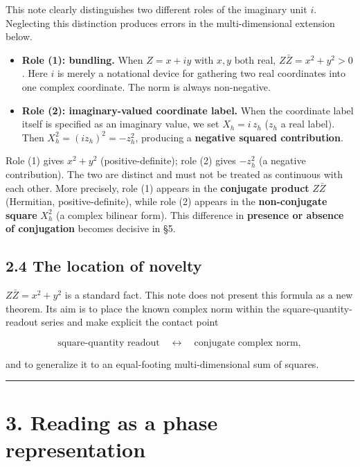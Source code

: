 \documentclass[11pt,a4paper]{article}
\providecommand{\tightlist}{\setlength{\itemsep}{0pt}\setlength{\parskip}{0pt}}
\begin{document}
This note clearly distinguishes two different roles of the imaginary
unit \(i\). Neglecting this distinction produces errors in the
multi-dimensional extension below.

\begin{itemize}
\tightlist
\item
  \textbf{Role (1): bundling.} When \(Z=x+iy\) with \(x,y\) both real,
  \(Z\bar Z=x^2+y^2>0\). Here \(i\) is merely a notational device for
  gathering two real coordinates into one complex coordinate. The norm
  is always non-negative.
\item
  \textbf{Role (2): imaginary-valued coordinate label.} When the
  coordinate label itself is specified as an imaginary value, we set
  \(X_h=i\,z_h\) (\(z_h\) a real label). Then
  \(X_h^2=(i z_h)^2=-z_h^2\), producing a \textbf{negative squared
  contribution}.
\end{itemize}

Role (1) gives \(x^2+y^2\) (positive-definite); role (2) gives
\(-z_h^2\) (a negative contribution). The two are distinct and must not
be treated as continuous with each other. More precisely, role (1)
appears in the \textbf{conjugate product} \(Z\bar Z\) (Hermitian,
positive-definite), while role (2) appears in the \textbf{non-conjugate
square} \(X_h^2\) (a complex bilinear form). This difference in
\textbf{presence or absence of conjugation} becomes decisive in §5.

\subsection{2.4 The location of novelty}\label{the-location-of-novelty}

\(Z\bar Z=x^2+y^2\) is a standard fact. This note does not present this
formula as a new theorem. Its aim is to place the known complex norm
within the square-quantity-readout series and make explicit the contact
point

\[
\text{square-quantity readout}\quad\leftrightarrow\quad\text{conjugate complex norm},
\]

and to generalize it to an equal-footing multi-dimensional sum of
squares.

\begin{center}\rule{0.5\linewidth}{0.5pt}\end{center}

\section{3. Reading as a phase
representation}\label{reading-as-a-phase-representation}
\end{document}
